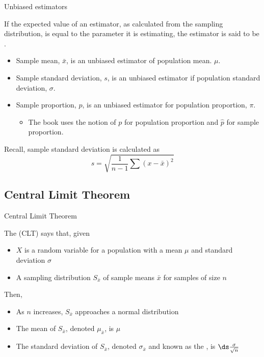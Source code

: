 \documentclass[xcolor=table, handout]{beamer}
\begin{document}
\begin{frame}{Unbiased estimators}
\begin{block}{}
{\large If the expected value of an estimator, as calculated from the sampling distribution, is equal to the parameter it is estimating, the estimator is said to be . }
\begin{itemize}
\pause\item Sample mean, $\bar x$, is an unbiased estimator of population mean. $\mu$.
\pause\item Sample standard deviation, $s$, is an unbiased estimator if population standard deviation, $\sigma$.
\pause\item Sample proportion, $p$, is an unbiased estimator for population proportion, $\pi$.
\begin{itemize}
\item The book uses the notion of $p$ for population proportion and $\hat p$ for sample proportion. 
\end{itemize}
\end{itemize}
\end{block}

\begin{alertblock}{}
Recall, sample standard deviation is calculated as 
\[s = \sqrt{\frac 1 {n-1} \sum (x - \bar x)^2}\]
\end{alertblock}
\end{frame}

\subsection{Central Limit Theorem}

\begin{frame}{Central Limit Theorem}
\begin{block}{}
The  (CLT) says that, given
\begin{itemize}
\pause\item $X$ is a random variable for a population with a mean $\mu$ and standard deviation $\sigma$
\pause\item A sampling distribution $S_{\bar x}$ of sample means $\bar x$ for samples of size $n$
\end{itemize}
\pause Then,
\begin{itemize}
\item As $n$ increases, $S_{\bar x}$ approaches a normal distribution
\pause\item The mean of $S_{\bar x}$, denoted $\mu_{\bar x}$, is $\mu$
\pause\item The standard deviation of $S_{\bar x}$, denoted $\sigma_{\bar x}$ and known as the , is $\ds \frac \sigma {\sqrt n}$  
\end{itemize}
\end{block}
\end{frame}
\end{document}
